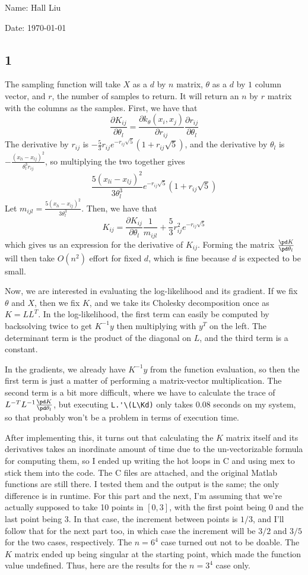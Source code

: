 \documentclass{article}
\begin{document}
Name: Hall Liu

Date: \today 
\vspace{1.5cm}
\subsection*{1}
The sampling function will take $X$ as a $d$ by $n$ matrix, $\theta$ as a $d$ by $1$ column vector, and $r$, the number of samples to return. It will return an $n$ by $r$ matrix with the columns as the samples.
First, we have that 
\[\frac{\partial K_{ij}}{\partial \theta_l}=\frac{\partial k_\theta(x_i, x_j)}{\partial r_{ij}}\frac{\partial r_{ij}}{\partial \theta_l}\]
The derivative by $r_{ij}$ is $-\frac{5}{3}r_{ij}e^{-r_{ij}\sqrt{5}}(1+r_{ij}\sqrt{5})$, and the derivative by $\theta_l$ is $-\frac{(x_{li}-x_{lj})^2}{\theta_l^3r_{ij}}$, so multiplying the two together gives
\[\frac{5(x_{li}-x_{lj})^2}{3\theta_l^3}e^{-r_{ij}\sqrt{5}}(1+r_{ij}\sqrt{5})\]
Let $m_{ijl}=\frac{5(x_{li}-x_{lj})^2}{3\theta_l^3}$. Then, we have that
\[K_{ij}=\frac{\partial K_{ij}}{\partial \theta_l}\frac{1}{m_{ijl}}+\frac{5}{3}r_{ij}^2e^{-r_{ij}\sqrt{5}}\]
which gives us an expression for the derivative of $K_{ij}$. Forming the matrix $\frac{\pd K}{\pd \theta_l}$ will then take $O(n^2)$ effort for fixed $d$, which is fine because $d$ is expected to be small.

Now, we are interested in evaluating the log-likelihood and its gradient. If we fix $\theta$ and $X$, then we fix $K$, and we take its Cholesky decomposition once as $K=LL^T$. In the log-likelihood, the first term can easily be computed by backsolving twice to get $K^{-1}y$ then multiplying with $y^T$ on the left. The determinant term is the product of the diagonal on $L$, and the third term is a constant. 

In the gradients, we already have $K^{-1}y$ from the function evaluation, so then the first term is just a matter of performing a matrix-vector multiplication. The second term is a bit more difficult, where we have to calculate the trace of $L^{-T}L^{-1}\frac{\pd K}{\pd\theta_l}$, but executing \verb|L.'\(L\Kd)| only takes $0.08$ seconds on my system, so that probably won't be a problem in terms of execution time. 

After implementing this, it turns out that calculating the $K$ matrix itself and its derivatives takes an inordinate amount of time due to the un-vectorizable formula for computing them, so I ended up writing the hot loops in C and using mex to stick them into the code. The C files are attached, and the original Matlab functions are still there. I tested them and the output is the same; the only difference is in runtime.
For this part and the next, I'm assuming that we're actually supposed to take 10 points in $[0,3]$, with the first point being 0 and the last point being 3. In that case, the increment between points is $1/3$, and I'll follow that for the next part too, in which case the increment will be $3/2$ and $3/5$ for the two cases, respectively.
The $n=6^4$ case turned out not to be doable. The $K$ matrix ended up being singular at the starting point, which made the function value undefined. Thus, here are the results for the $n=3^4$ case only. 
\end{document}
